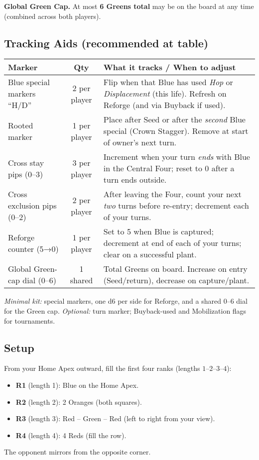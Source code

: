\documentclass[11pt]{article}
\begin{document}
\smallskip
\noindent\textbf{Global Green Cap.} At most \textbf{6 Greens total} may be on the board at any time (combined across both players).

\subsection*{Tracking Aids (recommended at table)}
\begin{tabularx}{\linewidth}{@{}l c X@{}}
\toprule
\textbf{Marker} & \textbf{Qty} & \textbf{What it tracks / When to adjust} \\
\midrule
Blue special markers “H/D” & 2 per player & Flip when that Blue has used \emph{Hop} or \emph{Displacement} (this life). Refresh on Reforge (and via Buyback if used). \\
Rooted marker & 1 per player & Place after Seed or after the \emph{second} Blue special (Crown Stagger). Remove at start of owner’s next turn. \\
Cross stay pips (0–3) & 3 per player & Increment when your turn \emph{ends} with Blue in the Central Four; reset to 0 after a turn ends outside. \\
Cross exclusion pips (0–2) & 2 per player & After leaving the Four, count your next \emph{two} turns before re-entry; decrement each of your turns. \\
Reforge counter (5→0) & 1 per player & Set to 5 when Blue is captured; decrement at end of each of your turns; clear on a successful plant. \\
Global Green-cap dial (0–6) & 1 shared & Total Greens on board. Increase on entry (Seed/return), decrease on capture/plant. \\
\bottomrule
\end{tabularx}

\smallskip
\noindent\textit{Minimal kit:} special markers, one d6 per side for Reforge, and a shared 0–6 dial for the Green cap. \textit{Optional:} turn marker; Buyback-used and Mobilization flags for tournaments.

\subsection*{Setup}
From your Home Apex outward, fill the first four ranks (lengths \(1\text{–}2\text{–}3\text{–}4\)):
\begin{itemize}[leftmargin=1.3em,itemsep=0.2em]
  \item \textbf{R1} (length 1): Blue on the Home Apex.
  \item \textbf{R2} (length 2): 2 Oranges (both squares).
  \item \textbf{R3} (length 3): Red – Green – Red (left to right from your view).
  \item \textbf{R4} (length 4): 4 Reds (fill the row).
\end{itemize}
The opponent mirrors from the opposite corner.
\end{document}
